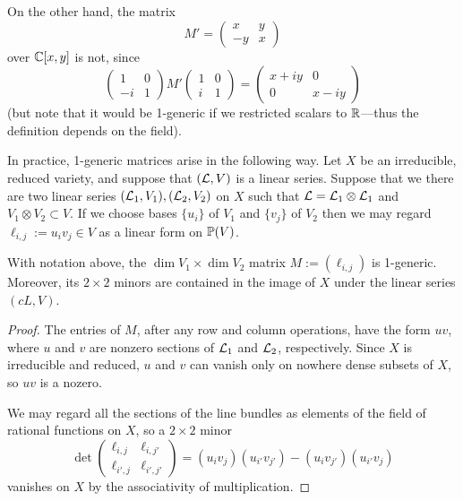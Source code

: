On the other hand, the matrix
$$
M' = \begin{pmatrix}
 x &y\\
 -y&x
\end{pmatrix}
$$
over $\CC[x,y]$ is not, since
$$
\begin{pmatrix}
1&0\\
-i&1 
\end{pmatrix}
M'
\begin{pmatrix}
 1&0\\
 i&1
\end{pmatrix}
= 
\begin{pmatrix}
 x+iy&0\\
 0&x-iy
\end{pmatrix}
$$
(but note that it would be 1-generic if we restricted scalars to $\RR$---thus the definition depends on the field).

In practice, 1-generic matrices arise in the following way. Let $X$ be
an irreducible, reduced variety, and suppose that $(\cL, V)$ is a linear series. Suppose that we there are two linear series $(\cL_1,V_1),  (\cL_2,V_2)$ on $X$
such that $\cL = \cL_1\otimes\cL_1$ and $V_1\otimes V_2 \subset V$. If we
choose
bases $\{u_i\}$ of $V_1$ and $\{v_j\}$ of $V_2$ then we may regard $\ell_{i,j}:=u_iv_j\in V$
as a linear form on $\PP(V)$.

\begin{proposition}\label{some generators}
 With notation above, the $\dim V_1 \times \dim V_2$ matrix 
$M :=  (\ell_{i,j})$ is 1-generic. Moreover, its $2\times 2$ minors are contained in 
the image of $X$ under the linear series $(cL, V)$.
\end{proposition}

\begin{proof}
The entries of $M$, after any row and column operations, have the form $uv$, where
$u$ and $v$ are nonzero sections of $\cL_1$ and $\cL_2$, respectively. Since $X$ is irreducible and reduced, $u$ and $v$ can vanish only on nowhere dense subsets of $X$, so $uv$ is a nozero.

We may regard all the sections of the line bundles as elements of the 
field of rational functions on $X$, so a $2\times 2$ minor 
$$
\det
\begin{pmatrix}
 \ell_{i,j}&\ell_{i,j'} \\
 \ell_{i',j}&\ell_{i',j'}
\end{pmatrix}
= (u_iv_j)(u_{i'}v_{j'}) - (u_{i}v_{j'}) (u_{i'}v_{j})
$$
vanishes on $X$ by the associativity of multiplication.
\end{proof}

